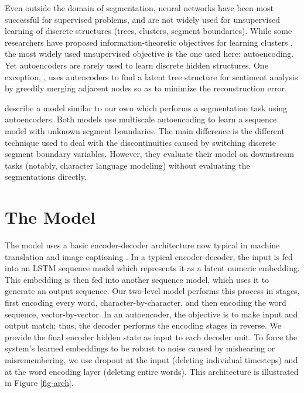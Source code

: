 \documentclass[11pt,letterpaper]{article}
\begin{document}
Even outside the domain of segmentation, neural networks have been
most successful for supervised problems, and are not widely used for
unsupervised learning of discrete structures (trees, clusters, segment
boundaries). While some researchers have proposed
information-theoretic objectives for learning clusters
\cite{Klapper01}, the most widely used unsupervised objective is the
one used here: autoencoding. Yet autoencoders are rarely used to learn
discrete hidden structures. One exception, , uses
autencoders to find a latent tree structure for sentiment analysis by
greedily merging adjacent nodes so as to minimize the reconstruction
error.

 describe a model similar to our own which performs a
segmentation task using autoencoders. Both models use multiscale
autoencoding to learn a sequence model with unknown segment
boundaries. The main difference is the different technique used to
deal with the discontinuities caused by switching discrete segment
boundary variables. However, they evaluate their model on downstream
tasks (notably, character language modeling) without evaluating the
segmentations directly.

\section{The Model}

The model uses a basic encoder-decoder architecture now typical in
machine translation \cite{Cho14} and image captioning
\cite{Vinyals15}. In a typical encoder-decoder, the input is fed into
an LSTM sequence model \cite{Hochreiter97} which represents it as a
latent numeric embedding. This embedding is then fed into another
sequence model, which uses it to generate an output sequence. Our
two-level model performs this process in stages, first encoding every
word, character-by-character, and then encoding the word sequence,
vector-by-vector. In an autoencoder, the objective is to make input
and output match; thus, the decoder performs the encoding stages in
reverse. We provide the final encoder hidden state as input to each
decoder unit. To force the system's learned embeddings to be robust to
noise caused by mishearing or misremembering, we use dropout
\cite{Srivastava14} at the input (deleting individual timesteps) and
at the word encoding layer (deleting entire words). This architecture
is illustrated in Figure \ref{fig-arch}.
\end{document}
